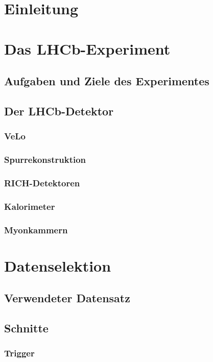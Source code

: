 \documentclass[a4paper]{scrbook}
\begin{document}

\tableofcontents

\chapter{Einleitung}

\chapter{Das LHCb-Experiment}
\section{Aufgaben und Ziele des Experimentes}
\section{Der LHCb-Detektor}
\subsection{VeLo}
\subsection{Spurrekonstruktion}
\subsection{RICH-Detektoren}
\subsection{Kalorimeter}
\subsection{Myonkammern}



\chapter{Datenselektion}
\section{Verwendeter Datensatz}
\section{Schnitte}
\subsection{Trigger}
\end{document}
